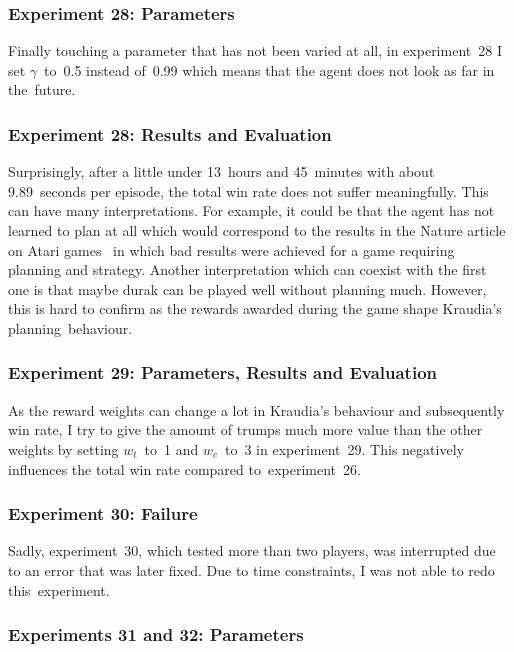 \documentclass[a4paper,titlepage]{article}
\begin{document}
\subsubsection*{Experiment 28: Parameters}

Finally touching a parameter that has not been varied at all, in experiment~28 I set $\gamma$~to~0.5 instead of~0.99 which means that the agent does not look as far in the~future.

\subsubsection*{Experiment 28: Results and Evaluation}

Surprisingly, after a little under 13~hours and 45~minutes with about 9.89~seconds per episode, the total win rate does not suffer meaningfully. This can have many interpretations. For example, it could be that the agent has not learned to plan at all which would correspond to the results in the Nature article on Atari games~\cite{nature} in which bad results were achieved for a game requiring planning and strategy. Another interpretation which can coexist with the first one is that maybe durak can be played well without planning much. However, this is hard to confirm as the rewards awarded during the game shape Kraudia's planning~behaviour.

\subsubsection*{Experiment 29: Parameters, Results and Evaluation}

As the reward weights can change a lot in Kraudia's behaviour and subsequently win rate, I try to give the amount of trumps much more value than the other weights by setting $w_t$~to~1 and $w_c$~to~3 in experiment~29. This negatively influences the total win rate compared to~experiment~26.

\subsubsection*{Experiment 30: Failure}

Sadly, experiment~30, which tested more than two players, was interrupted due to an error that was later fixed. Due to time constraints, I was not able to redo this~experiment.

\subsubsection*{Experiments 31 and 32: Parameters}
\end{document}
